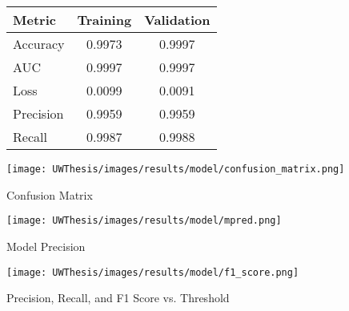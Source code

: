 \documentclass [11pt, proquest] {uwthesis}[2020/02/24]
\begin{document}
\begin{figure}[H]
\begin{minipage}[b]{0.48\textwidth}
\centering
\begin{tabular}{lcc}
\hline
\textbf{Metric} & \textbf{Training} & \textbf{Validation} \\
\hline
Accuracy & 0.9973 & 0.9997 \\
AUC & 0.9997 & 0.9997 \\
Loss & 0.0099 & 0.0091 \\
Precision & 0.9959 & 0.9959 \\
Recall & 0.9987 & 0.9988 \\
\hline
\end{tabular}
\label{tab:model-evaluation-metrics}
\end{minipage}
\hfill
\begin{minipage}[b]{0.48\textwidth}
\centering
\texttt{[image: UWThesis/images/results/model/confusion\_matrix.png]}
\caption{Confusion Matrix}
\label{fig:threshold-vs-metrics}
\end{minipage}
\end{figure}


\begin{figure}[h]
  \centering
  \begin{minipage}{0.48\textwidth}
    \centering
    \texttt{[image: UWThesis/images/results/model/mpred.png]}
    \caption{Model Precision}
    \label{fig:model_precision}
  \end{minipage}
  \hfill
  \begin{minipage}{0.48\textwidth}
    \centering
    \texttt{[image: UWThesis/images/results/model/f1\_score.png]}
    \caption{Precision, Recall, and F1 Score vs. Threshold}
    \label{fig:model_f1_threshold}
  \end{minipage}
\end{figure}
\end{document}
